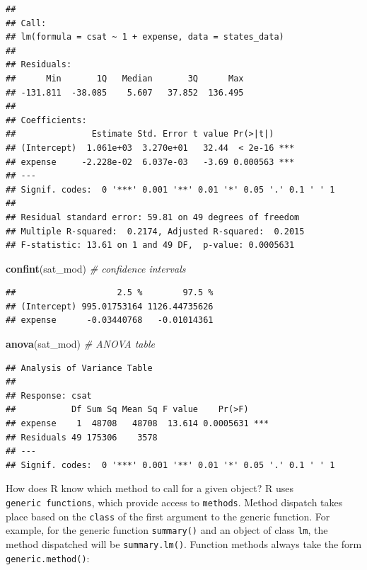 \documentclass[
]{book}
\newenvironment{Shaded}{\begin{snugshade}}{\end{snugshade}}
\newcommand{\CommentTok}[1]{\textcolor[rgb]{0.56,0.35,0.01}{\textit{#1}}}
\newcommand{\KeywordTok}[1]{\textcolor[rgb]{0.13,0.29,0.53}{\textbf{#1}}}
\newcommand{\NormalTok}[1]{#1}
\begin{document}
\begin{verbatim}
## 
## Call:
## lm(formula = csat ~ 1 + expense, data = states_data)
## 
## Residuals:
##      Min       1Q   Median       3Q      Max 
## -131.811  -38.085    5.607   37.852  136.495 
## 
## Coefficients:
##               Estimate Std. Error t value Pr(>|t|)    
## (Intercept)  1.061e+03  3.270e+01   32.44  < 2e-16 ***
## expense     -2.228e-02  6.037e-03   -3.69 0.000563 ***
## ---
## Signif. codes:  0 '***' 0.001 '**' 0.01 '*' 0.05 '.' 0.1 ' ' 1
## 
## Residual standard error: 59.81 on 49 degrees of freedom
## Multiple R-squared:  0.2174, Adjusted R-squared:  0.2015 
## F-statistic: 13.61 on 1 and 49 DF,  p-value: 0.0005631
\end{verbatim}

\begin{Shaded}
\begin{Highlighting}[]
  \KeywordTok{confint}\NormalTok{(sat\_mod) }\CommentTok{\# confidence intervals}
\end{Highlighting}
\end{Shaded}

\begin{verbatim}
##                    2.5 %        97.5 %
## (Intercept) 995.01753164 1126.44735626
## expense      -0.03440768   -0.01014361
\end{verbatim}

\begin{Shaded}
\begin{Highlighting}[]
  \KeywordTok{anova}\NormalTok{(sat\_mod) }\CommentTok{\# ANOVA table  }
\end{Highlighting}
\end{Shaded}

\begin{verbatim}
## Analysis of Variance Table
## 
## Response: csat
##           Df Sum Sq Mean Sq F value    Pr(>F)    
## expense    1  48708   48708  13.614 0.0005631 ***
## Residuals 49 175306    3578                      
## ---
## Signif. codes:  0 '***' 0.001 '**' 0.01 '*' 0.05 '.' 0.1 ' ' 1
\end{verbatim}

How does R know which method to call for a given object? R uses \texttt{generic\ functions}, which provide access to \texttt{methods}. Method dispatch takes place based on the \texttt{class} of the first argument to the generic function. For example, for the generic function \texttt{summary()} and an object of class \texttt{lm}, the method dispatched will be \texttt{summary.lm()}. Function methods always take the form \texttt{generic.method()}:
\end{document}

